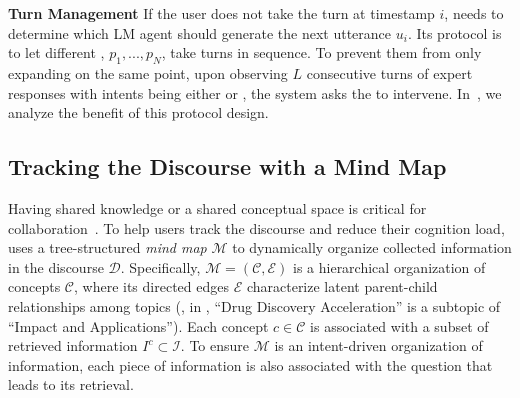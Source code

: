 \noindent
\textbf{Turn Management}\quad
If the user does not take the turn at timestamp $i$, \system needs to determine which LM agent should generate the next utterance $u_i$. Its protocol is to let different \experts, $p_1, ..., p_N$, take turns in sequence. To prevent them from only expanding on the same point, upon observing $L$ consecutive turns of expert responses with intents being either  or , the system asks the \moderator to intervene.
In~, we analyze the benefit of this protocol design.




\subsection{Tracking the Discourse with a Mind Map}
\label{sec:mind_map}

Having shared knowledge or a shared conceptual space is critical for collaboration~\citep{roschelle1995construction}. To help users track the discourse and reduce their cognition load, \system uses a tree-structured \textit{mind map} $\mathcal{M}$ to dynamically organize collected information in the discourse $\mathcal{D}$. 
Specifically, $\mathcal{M} = (\mathcal{C}, \mathcal{E})$ is a hierarchical organization of concepts $\mathcal{C}$, where its directed edges $\mathcal{E}$ characterize latent parent-child relationships among topics (\eg, in , ``Drug Discovery Acceleration'' is a subtopic of ``Impact and Applications''). Each concept $c\in\mathcal{C}$ is associated with a subset of retrieved information $I^{c}\subset\mathcal{I}$. To ensure $\mathcal{M}$ is an intent-driven organization of information, each piece of information is also associated with the question that leads to its retrieval.


